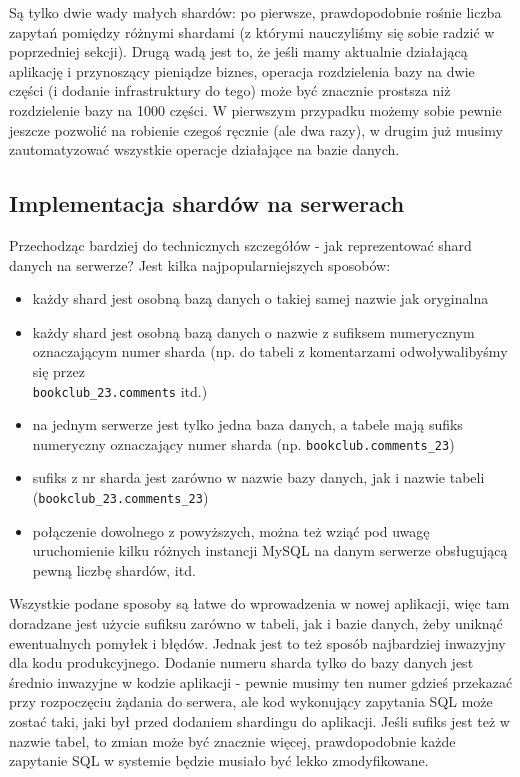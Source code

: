 \documentclass[a4paper,12pt]{article}
\begin{document}
Są tylko dwie wady małych shardów: po pierwsze, prawdopodobnie rośnie liczba zapytań pomiędzy różnymi shardami (z którymi nauczyliśmy się sobie radzić w poprzedniej sekcji). Drugą wadą jest to, że jeśli mamy aktualnie działającą aplikację i przynoszący pieniądze biznes, operacja rozdzielenia bazy na dwie części (i dodanie infrastruktury do tego) może być znacznie prostsza niż rozdzielenie bazy na 1000 części. W pierwszym przypadku możemy sobie pewnie jeszcze pozwolić na robienie czegoś ręcznie (ale dwa razy), w drugim już musimy zautomatyzować wszystkie operacje działające na bazie danych.

\subsection{Implementacja shardów na serwerach}

Przechodząc bardziej do technicznych szczegółów - jak reprezentować shard danych na serwerze? Jest kilka najpopularniejszych sposobów:

\begin{itemize}
 \item każdy shard jest osobną bazą danych o takiej samej nazwie jak oryginalna
 \item każdy shard jest osobną bazą danych o nazwie z sufiksem numerycznym oznaczającym numer sharda (np. do tabeli z komentarzami odwoływalibyśmy się przez\\ \texttt{bookclub\_23.comments} itd.)
 \item na jednym serwerze jest tylko jedna baza danych, a tabele mają sufiks numeryczny oznaczający numer sharda (np. \texttt{bookclub.comments\_23})
 \item sufiks z nr sharda jest zarówno w nazwie bazy danych, jak i nazwie tabeli \\(\texttt{bookclub\_23.comments\_23})
 \item połączenie dowolnego z powyższych, można też wziąć pod uwagę uruchomienie kilku różnych instancji MySQL na danym serwerze obsługującą pewną liczbę shardów, itd.
\end{itemize}

Wszystkie podane sposoby są łatwe do wprowadzenia w nowej aplikacji, więc tam doradzane jest użycie sufiksu zarówno w tabeli, jak i bazie danych, żeby uniknąć ewentualnych pomyłek i błędów. Jednak jest to też sposób najbardziej inwazyjny dla kodu produkcyjnego. Dodanie numeru sharda tylko do bazy danych jest średnio inwazyjne w kodzie aplikacji - pewnie musimy ten numer gdzieś przekazać przy rozpoczęciu żądania do serwera, ale kod wykonujący zapytania SQL może zostać taki, jaki był przed dodaniem shardingu do aplikacji. Jeśli sufiks jest też w nazwie tabel, to zmian może być znacznie więcej, prawdopodobnie każde zapytanie SQL w systemie będzie musiało być lekko zmodyfikowane.
\end{document}

